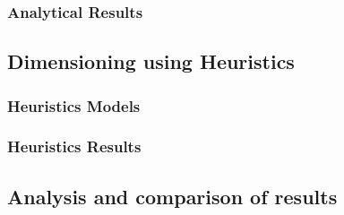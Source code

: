 \subsubsection{Analytical Results}

\newpage

\subsection{Dimensioning using Heuristics}

\subsubsection{Heuristics Models}

\subsubsection{Heuristics Results}

\subsection{Analysis and comparison of results}
